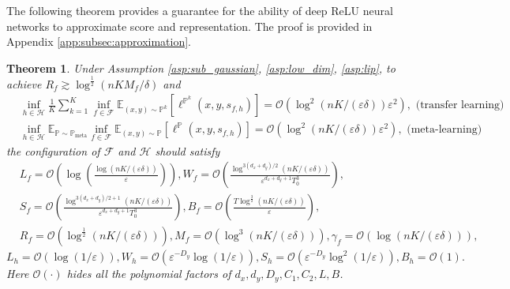 \documentclass{article}
\numberwithin{equation}{section}
\newcommand{\E}{\mathbb{E}}
\newtheorem{thm}{Theorem}[section]
\theoremstyle{definition}
\newcommand{\Pmeta}{\mathbb{P}_{\text{meta}}}
\renewcommand{\P}{\mathbb{P}}
\begin{document}
The following theorem provides a guarantee for the ability of deep ReLU neural networks to approximate score and representation.
The proof is provided in Appendix \ref{app:subsec:approximation}.
\begin{thm}\label{thm:approximation_all_informal}
     Under Assumption \ref{asp:sub_gaussian}, \ref{asp:low_dim}, \ref{asp:lip}, to achieve $R_f\gtrsim\log^{\frac{1}{2}}(nKM_f/\delta)$ and
    \begin{align}
        &\inf_{h\in\mathcal{H}} \frac{1}{K}\sum_{k=1}^K \inf_{f\in\mathcal{F}}\E_{(x,y)\sim\P^k} [\ell^{\P^k} (x,y,s_{f,h})] = \mathcal{O}\left(\log^2(nK/(\varepsilon\delta))\varepsilon^2\right), \text{ (transfer learning)} \\
        &\inf_{h\in\mathcal{H}}\E_{\P\sim\Pmeta}\inf_{f\in\mathcal{F}}\E_{(x,y)\sim\P} [\ell^\P(x,y,s_{f,h})] = \mathcal{O}\left(\log^2(nK/(\varepsilon\delta))\varepsilon^2\right), \text{ (meta-learning)}
    \end{align}
    the configuration of $\mathcal{F}$ and $\mathcal{H}$ should satisfy
    \begin{equation}
        \begin{aligned}
            &L_f=\mathcal{O}\left(\log\left(\frac{\log(nK/(\varepsilon\delta))}{\varepsilon}\right)\right),
            W_f=\mathcal{O}\left(\frac{\log^{3(d_x+d_y)/2}(nK/(\varepsilon\delta))}{\varepsilon^{d_x+d_y+1}T_0^3}\right), \\
            &S_f=\mathcal{O}\left(\frac{\log^{3(d_x+d_y)/2+1}(nK/(\varepsilon\delta))}{\varepsilon^{d_x+d_y+1}T_0^3}\right),
            B_f=\mathcal{O}\left(\frac{T\log^{\frac{3}{2}}(nK/(\varepsilon\delta))}{\varepsilon}\right), \\
            &R_f=\mathcal{O}\left(\log^{\frac{1}{2}}(nK/(\varepsilon\delta))\right), 
            M_f=\mathcal{O}\left(\log^3(nK/(\varepsilon\delta))\right),
            \gamma_f=\mathcal{O}\left(\log(nK/(\varepsilon\delta))\right),
        \end{aligned}
    \end{equation}
     \begin{equation}
        L_h=\mathcal{O}\left(\log(1/\varepsilon)\right), W_h=\mathcal{O}\left(\varepsilon^{-D_y}\log(1/\varepsilon)\right), 
        S_h=\mathcal{O}\left(\varepsilon^{-D_y}\log^2(1/\varepsilon)\right),
        B_h = \mathcal{O}(1).
    \end{equation}
    Here $\mathcal{O}(\cdot)$ hides all the polynomial factors of $d_x,d_y,D_y,C_1,C_2,L,B$.
\end{thm}
\end{document}
